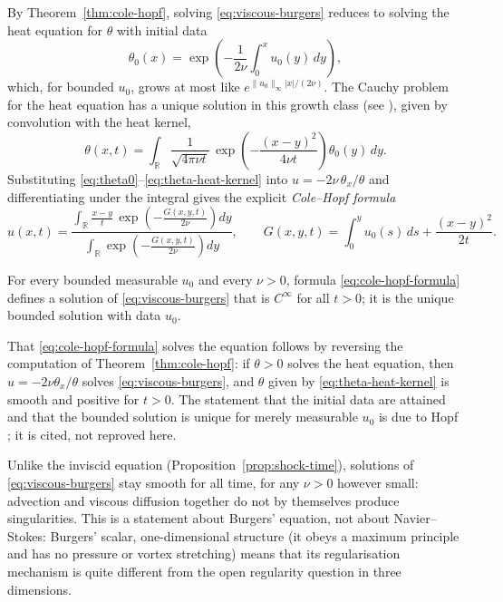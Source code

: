 By Theorem~\ref{thm:cole-hopf}, solving \eqref{eq:viscous-burgers} reduces
to solving the heat equation for $\theta$ with initial data
\begin{equation}
  \label{eq:theta0}
  \theta_0(x) = \exp\left(-\frac{1}{2\nu}\int_0^x u_0(y)\, dy\right),
\end{equation}
which, for bounded $u_0$, grows at most like $e^{\|u_0\|_\infty|x|/(2\nu)}$.
The Cauchy problem for the heat equation has a unique solution in this
growth class (see \cite[\S2.3.3]{evans2010}), given by convolution with
the heat kernel,
\begin{equation}
  \label{eq:theta-heat-kernel}
  \theta(x,t) = \int_{\mathbb{R}} \frac{1}{\sqrt{4\pi\nu t}}\,
    \exp\left(-\frac{(x-y)^2}{4\nu t}\right) \theta_0(y)\, dy.
\end{equation}
Substituting \eqref{eq:theta0}--\eqref{eq:theta-heat-kernel} into
$u=-2\nu\,\theta_x/\theta$ and differentiating under the integral gives
the explicit \emph{Cole--Hopf formula}
\begin{equation}
  \label{eq:cole-hopf-formula}
  u(x,t) = \frac{\displaystyle\int_{\mathbb{R}} \frac{x-y}{t}\, \exp\left(-\frac{G(x,y,t)}{2\nu}\right) dy}
                {\displaystyle\int_{\mathbb{R}} \exp\left(-\frac{G(x,y,t)}{2\nu}\right) dy},
  \qquad
  G(x,y,t) = \int_0^y u_0(s)\, ds + \frac{(x-y)^2}{2t}.
\end{equation}

\begin{corollary}
\label{cor:global-smoothness}
For every bounded measurable $u_0$ and every $\nu>0$, formula
\eqref{eq:cole-hopf-formula} defines a solution of
\eqref{eq:viscous-burgers} that is $C^\infty$ for all $t>0$; it is the
unique bounded solution with data $u_0$.
\end{corollary}

\noindent That \eqref{eq:cole-hopf-formula} solves the equation follows by
reversing the computation of Theorem~\ref{thm:cole-hopf}: if $\theta>0$
solves the heat equation, then $u=-2\nu\theta_x/\theta$ solves
\eqref{eq:viscous-burgers}, and $\theta$ given by
\eqref{eq:theta-heat-kernel} is smooth and positive for $t>0$. The
statement that the initial data are attained and that the bounded
solution is unique for merely measurable $u_0$ is due to Hopf
\cite{hopf1950}; it is cited, not reproved here.

Unlike the inviscid equation (Proposition~\ref{prop:shock-time}),
solutions of \eqref{eq:viscous-burgers} stay smooth for all time, for
any $\nu>0$ however small: advection and viscous diffusion together do
not by themselves produce singularities. This is a statement about Burgers' equation, not about
Navier--Stokes: Burgers' scalar, one-dimensional structure (it obeys a
maximum principle and has no pressure or vortex stretching) means that its
regularisation mechanism is quite different from the open regularity
question in three dimensions.

